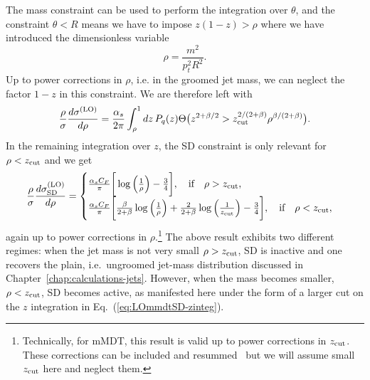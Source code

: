 The mass constraint can be used to perform the integration over
$\theta$, and the constraint $\theta<R$ means we have to impose
$z(1-z)>\rho$ where we have introduced the dimensionless variable
\begin{equation}\label{eq:rho-definition}
  \rho = \frac{m^2}{p_t^2R^2}.
\end{equation}
Up to power corrections in $\rho$, i.e. in the groomed jet mass, we
can neglect the factor $1-z$ in this constraint.
%
We are therefore left with
\begin{equation}\label{eq:LOmmdtSD-zinteg}
  \frac{\rho}{\sigma}\frac{d\sigma^{\text{(LO)}}}{d\rho}
  = \frac{\alpha_s}{2\pi} \int_\rho^1dz\,P_q(z)
  \Theta\big(z^{2+\beta/2}>z_{\text{cut}}^{2/(2+\beta)}\rho^{\beta/(2+\beta)}\big).
\end{equation}
In the remaining integration over $z$, the SD constraint is only
relevant for $\rho<z_{\text{cut}}$ and we get 
%
\begin{equation} \label{eq:sigma-SD-LO}
  \frac{\rho}{\sigma}\frac{d\sigma^{\text{(LO)}}_\text{SD}}{d\rho} =
  \begin{cases}
   \frac{\alpha_sC_F}{\pi}
    \bigg[\log\Big(\frac{1}{\rho}\Big)-\frac{3}{4}\bigg],
  \quad \text{if} \quad \rho>z_{\text{cut}},  \\
    \frac{\alpha_sC_F}{\pi}
    \bigg[\frac{\beta}{2+\beta}\log\Big(\frac{1}{\rho}\Big)+\frac{2}{2+\beta}\log\Big(\frac{1}{z_{\text{cut}}}\Big)-\frac{3}{4}\bigg],
  \quad \text{if} \quad \rho<z_{\text{cut}},
  \end{cases}
\end{equation}
again up to power corrections in $\rho$.\footnote{Technically, for
  mMDT, this result is valid up to power corrections in $z_{\text{cut}}$. These
  corrections can be included and
  resummed~\cite{Dasgupta:2013ihk,Marzani:2017mva} but we will assume
  small $z_{\text{cut}}$ here and neglect them.}
%
The above result exhibits two different regimes: when the jet mass is
not very small $\rho>z_{\text{cut}}$, SD is inactive and one recovers the
plain, i.e.\ ungroomed jet-mass distribution discussed in Chapter~\ref{chap:calculations-jets}. However, when the mass becomes
smaller, $\rho<z_{\text{cut}}$, SD becomes active, as manifested here
under the form of a larger cut on the $z$ integration in Eq.~(\ref{eq:LOmmdtSD-zinteg}).

